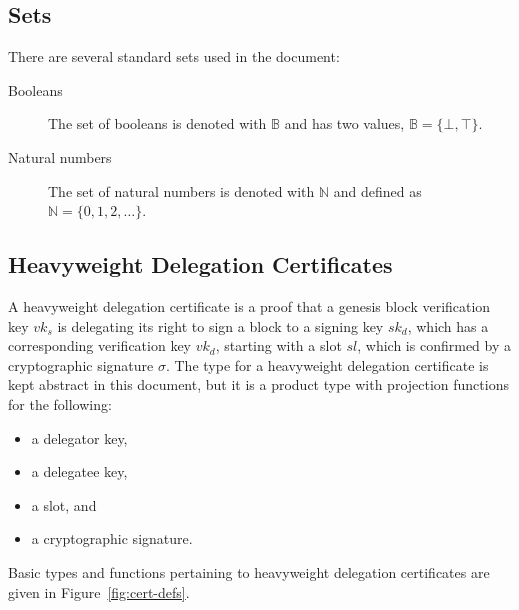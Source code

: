 \documentclass[11pt,a4paper]{article}
\begin{document}
\subsection{Sets}
\label{sec:sets}

There are several standard sets used in the document:
%
\begin{description}
\item[Booleans] The set of booleans is denoted with $\mathbb{B}$ and has two
  values, $\mathbb{B} = \{\bot, \top\}$.
\item[Natural numbers] The set of natural numbers is denoted with
  $\mathbb{N}$ and defined as $\mathbb{N} = \{0, 1, 2, \dots\}$.
\end{description}

\subsection{Heavyweight Delegation Certificates}
\label{sec:certificates}

A heavyweight delegation certificate is a proof that a genesis block
verification key $vk_s$ is delegating its right to sign a block to a signing
key $sk_d$, which has a corresponding verification key $vk_d$, starting with a
slot $sl$, which is confirmed by a cryptographic signature $\sigma$.
%
The type for a heavyweight delegation certificate is kept abstract in this
document, but it is a product type with projection functions for the
following:
%
\begin{itemize}
\item a delegator key,
\item a delegatee key,
\item a slot, and
\item a cryptographic signature.
\end{itemize}

Basic types and functions pertaining to heavyweight delegation certificates
are given in Figure~\ref{fig:cert-defs}.
\end{document}
